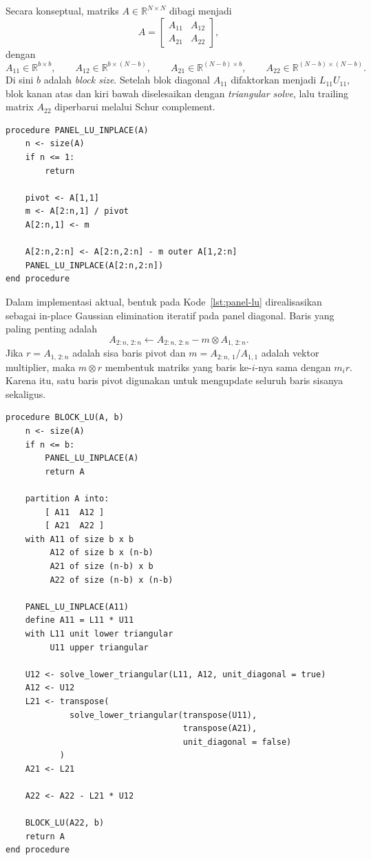 \documentclass[12pt,a4paper]{article}
\begin{document}
Secara konseptual, matriks $A\in\mathbb{R}^{N\times N}$ dibagi menjadi
\[
A =
\begin{bmatrix}
A_{11} & A_{12} \\
A_{21} & A_{22}
\end{bmatrix},
\]
dengan
\[
A_{11}\in\mathbb{R}^{b\times b}, \qquad
A_{12}\in\mathbb{R}^{b\times (N-b)}, \qquad
A_{21}\in\mathbb{R}^{(N-b)\times b}, \qquad
A_{22}\in\mathbb{R}^{(N-b)\times (N-b)}.
\]
Di sini $b$ adalah \emph{block size}. Setelah blok diagonal $A_{11}$ difaktorkan menjadi $L_{11}U_{11}$, blok kanan atas dan kiri bawah diselesaikan dengan \emph{triangular solve}, lalu trailing matrix $A_{22}$ diperbarui melalui Schur complement.

\begin{lstlisting}[style=pseudo,caption={Grand plan panel LU in-place pada blok diagonal kecil.},label={lst:panel-lu}]
procedure PANEL_LU_INPLACE(A)
    n <- size(A)
    if n <= 1:
        return

    pivot <- A[1,1]
    m <- A[2:n,1] / pivot
    A[2:n,1] <- m

    A[2:n,2:n] <- A[2:n,2:n] - m outer A[1,2:n]
    PANEL_LU_INPLACE(A[2:n,2:n])
end procedure
\end{lstlisting}

Dalam implementasi aktual, bentuk pada Kode~\ref{lst:panel-lu} direalisasikan sebagai in-place Gaussian elimination iteratif pada panel diagonal. Baris yang paling penting adalah
\[
A_{2:n,\,2:n} \leftarrow A_{2:n,\,2:n} - m \otimes A_{1,\,2:n}.
\]
Jika $r=A_{1,\,2:n}$ adalah sisa baris pivot dan $m=A_{2:n,\,1}/A_{1,1}$ adalah vektor multiplier, maka $m\otimes r$ membentuk matriks yang baris ke-$i$-nya sama dengan $m_i r$. Karena itu, satu baris pivot digunakan untuk mengupdate seluruh baris sisanya sekaligus.

\begin{lstlisting}[style=pseudo,caption={Grand plan Block LU utama.},label={lst:block-lu}]
procedure BLOCK_LU(A, b)
    n <- size(A)
    if n <= b:
        PANEL_LU_INPLACE(A)
        return A

    partition A into:
        [ A11  A12 ]
        [ A21  A22 ]
    with A11 of size b x b
         A12 of size b x (n-b)
         A21 of size (n-b) x b
         A22 of size (n-b) x (n-b)

    PANEL_LU_INPLACE(A11)
    define A11 = L11 * U11
    with L11 unit lower triangular
         U11 upper triangular

    U12 <- solve_lower_triangular(L11, A12, unit_diagonal = true)
    A12 <- U12
    L21 <- transpose(
             solve_lower_triangular(transpose(U11),
                                    transpose(A21),
                                    unit_diagonal = false)
           )
    A21 <- L21

    A22 <- A22 - L21 * U12

    BLOCK_LU(A22, b)
    return A
end procedure
\end{lstlisting}
\end{document}

